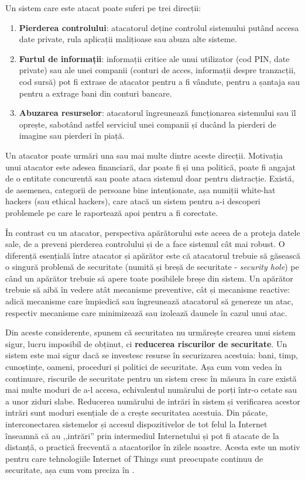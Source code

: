 Un sistem care este atacat poate suferi pe trei direcții:
\begin{enumerate}
  \item \textbf{Pierderea controlului}: atacatorul deține controlul sistemului putând accesa date private, rula aplicații malițioase sau abuza alte sisteme.
  \item \textbf{Furtul de informații}: informații critice ale unui utilizator (cod PIN, date private) sau ale unei companii (conturi de acces, informații despre tranzacții, cod sursă) pot fi extrase de atacator pentru a fi vândute, pentru a șantaja sau pentru a extrage bani din conturi bancare.
  \item \textbf{Abuzarea resurselor}: atacatorul îngreunează funcționarea sistemului sau îl oprește, sabotând astfel serviciul unei companii și ducând la pierderi de imagine sau pierderi în piață.
\end{enumerate}

Un atacator poate urmări una sau mai multe dintre aceste direcții.
Motivația unui atacator este adesea financiară, dar poate fi și una politică, poate fi angajat de o entitate concurentă sau poate ataca sistemul doar pentru distracție.
Există, de asemenea, categorii de persoane bine intenționate, așa numiții white-hat hackers (sau ethical hackers), care atacă un sistem pentru a-i descoperi problemele pe care le raportează apoi pentru a fi corectate.

În contrast cu un atacator, perspectiva apărătorului este aceea de a proteja datele sale, de a preveni pierderea controlului și de a face sistemul cât mai robust.
O diferență esențială între atacator și apărător este că atacatorul trebuie să găsească o singură problemă de securitate (numită și breșă de securitate - \textit{security hole}) pe când un apărător trebuie să apere toate posibilele breșe din sistem.
Un apărător trebuie să aibă în vedere atât mecanisme preventive, cât și mecanisme reactive: adică mecanisme care împiedică sau îngreunează atacatorul să genereze un atac, respectiv mecanisme care minimizează sau izolează daunele în cazul unui atac.

Din aceste considerente, spunem că securitatea nu urmărește crearea unui sistem sigur, lucru imposibil de obținut, ci \textbf{reducerea riscurilor de securitate}.
Un sistem este mai sigur dacă se investesc resurse în securizarea acestuia: bani, timp, cunoștințe, oameni, proceduri și politici de securitate.
Așa cum vom vedea în continuare, riscurile de securitate pentru un sistem cresc în măsura în care există mai multe moduri de a-l accesa, echivalentul numărului de porți într-o cetate sau a unor ziduri slabe.
Reducerea numărului de intrări în sistem și verificarea acestor intrări sunt moduri esențiale de a crește securitatea acestuia.
Din păcate, interconectarea sistemelor și accesul dispozitivelor de tot felul la Internet înseamnă că au ,,intrări'' prin intermediul Internetului și pot fi atacate de la distanță, o practică frecventă a atacatorilor în zilele noastre.
Acesta este un motiv pentru care tehnologiile Internet of Things sunt preocupate continuu de securitate, așa cum vom preciza în .

